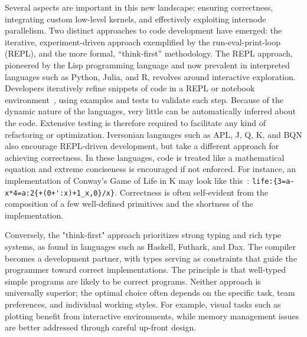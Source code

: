 Several aspects are important in this new landscape: ensuring correctness, integrating custom low-level kernels, and effectively exploiting internode parallelism. Two distinct approaches to code development have emerged: the iterative, experiment-driven approach exemplified by the run-eval-print-loop (REPL), and the more formal, ``think-first'' methodology. The REPL approach, pioneered by the Lisp programming language and now prevalent in interpreted languages such as Python, Julia, and R, revolves around interactive exploration. Developers iteratively refine snippets of code in a REPL or notebook environment~, using examples and tests to validate each step. Because of the dynamic nature of the languages, very little can be automatically inferred about the code. Extensive testing is therefore required to facilitate any kind of refactoring or optimization. Iversonian languages such as APL, J, Q, K, and BQN also encourage REPL-driven development, but take a different approach for achieving correctness. In these languages, code is treated like a mathematical equation and extreme conciseness is encouraged if not enforced. For instance, an implementation of Conway's Game of Life in K may look like this~: \verb|life:{3=a-x*4=a:2{+(0+':x)+1_x,0}/x}|. Correctness is often self-evident from the composition of a few well-defined primitives and the shortness of the implementation.

Conversely, the "think-first" approach prioritizes strong typing and rich type systems, as found in languages such as Haskell, Futhark, and Dax. The compiler becomes a development partner, with types serving as constraints that guide the programmer toward correct implementations. The principle is that well-typed simple programs are likely to be correct programs. Neither approach is universally superior; the optimal choice often depends on the specific task, team preferences, and individual working styles. For example, visual tasks such as plotting benefit from interactive environments, while memory management issues are better addressed through careful up-front design.

